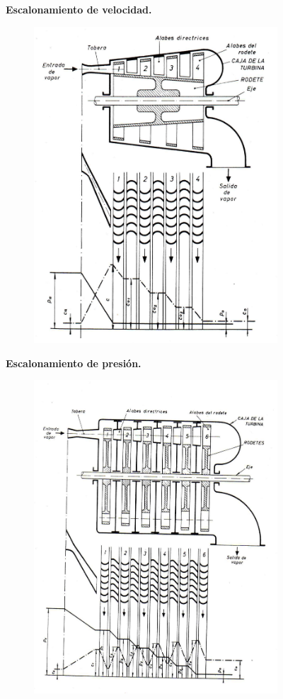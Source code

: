 \begin{figure}[H]
	\begin{minipage}{0.50\textwidth}
		\centering
		\textbf{Escalonamiento de velocidad.}
		\begin{figure}[H]
			\centering
			\includegraphics[width=0.7\linewidth]{res/tema10/escVel}
			\label{fig:escvel}
		\end{figure}
	\end{minipage}
	\begin{minipage}{0.50\textwidth}
		\centering
		\textbf{Escalonamiento de presión.}
		\begin{figure}[H]
			\centering
			\includegraphics[width=0.7\linewidth]{res/tema10/escpre}
			\label{fig:escpre}
		\end{figure}
	\end{minipage}
\end{figure}








